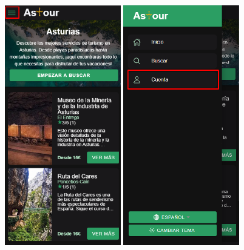 \begin{figure}[H]
	\centering
	\begin{minipage}{0.45\textwidth}
		\centering
		\includegraphics[width=0.45\textwidth]{7-Construccion/Manuales/mobile/menu marcado.png}
		\includegraphics[width=0.45\textwidth]{7-Construccion/Manuales/mobile/cuenta marcado.png}

\end{minipage}
\end{figure}
